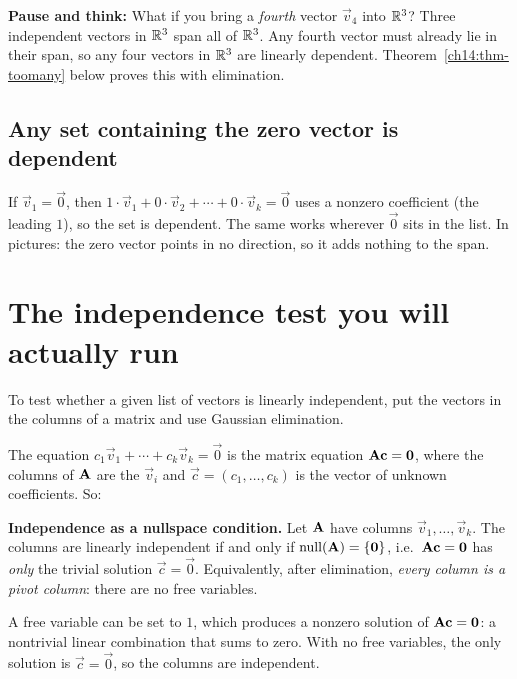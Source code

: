 \begin{labbox}
\textbf{Pause and think:} What if you bring a \emph{fourth} vector $\vec{v}_4$ into $\mathbb{R}^3$?
Three independent vectors in $\mathbb{R}^3$ span all of $\mathbb{R}^3$. Any fourth vector must
already lie in their span, so any four vectors in $\mathbb{R}^3$ are linearly dependent.
Theorem~\ref{ch14:thm-toomany} below proves this with elimination.
\end{labbox}

\subsection*{Any set containing the zero vector is dependent}

If $\vec{v}_1 = \vec{0}$, then $1\cdot\vec{v}_1 + 0\cdot\vec{v}_2 + \cdots +
0\cdot\vec{v}_k = \vec{0}$ uses a nonzero coefficient (the leading $1$), so the
set is dependent. The same works wherever $\vec{0}$ sits in the list. In pictures:
the zero vector points in no direction, so it adds nothing to the span.

\section{The independence test you will actually run}
\label{ch14:test}

To test whether a given list of vectors is linearly independent, put the
vectors in the columns of a matrix and use Gaussian elimination.

The equation $c_1\vec{v}_1 + \cdots + c_k\vec{v}_k = \vec{0}$ is the
matrix equation $\mathbf{A}\mathbf{c} = \mathbf{0}$, where the columns of $\mathbf{A}$ are the
$\vec{v}_i$ and $\vec{c} = (c_1,\dots,c_k)$ is the vector of unknown coefficients. So:

\begin{formalbox}
\textbf{Independence as a nullspace condition.} Let $\mathbf{A}$ have columns
$\vec{v}_1,\dots,\vec{v}_k$. The columns are linearly independent if and only if
$\operatorname{null}(\mathbf{A}) = \{\mathbf{0}\}$, i.e.\ $\mathbf{A}\mathbf{c}=\mathbf{0}$ has \emph{only}
the trivial solution $\vec{c}=\vec{0}$. Equivalently, after elimination, \emph{every column is a
pivot column}: there are no free variables.
\end{formalbox}

A free variable can be set to $1$, which produces a nonzero solution of $\mathbf{A}\mathbf{c}=\mathbf{0}$:
a nontrivial linear combination that sums to zero. With no free
variables, the only solution is $\vec{c}=\vec{0}$, so the columns are
independent.

